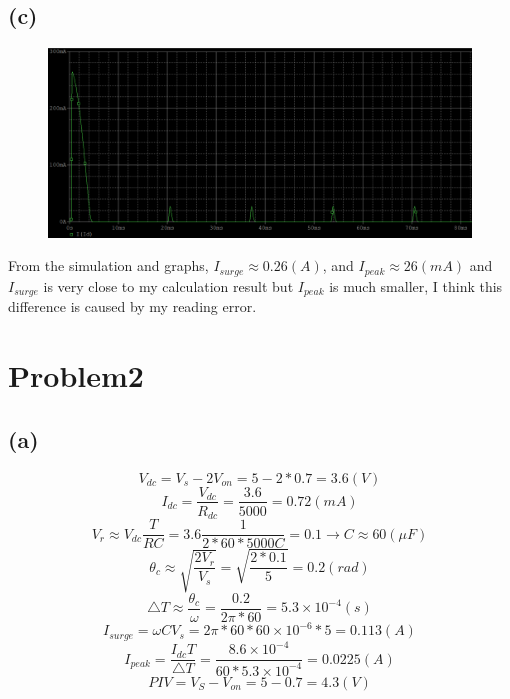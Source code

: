 \documentclass[12pt]{article}
\begin{document}
\subsection{(c)}
\begin{figure}[H]
\centering
\includegraphics[scale=0.3]{P2.png}
\end{figure}
\par From the simulation and graphs, $I_{surge}\approx 0.26(A)$, and $I_{peak} \approx 26(mA)$ and
$I_{surge}$ is very close to my calculation result but $I_{peak}$ is much smaller, I think this difference is caused by my reading error.

\section{Problem2}
\subsection{(a)}
$$V_{dc}=V_s-2V_{on}=5-2*0.7=3.6(V)$$
$$I_{dc}=\frac{V_{dc}}{R_{dc}}=\frac{3.6}{5000}=0.72(mA)$$
$$V_r\approx V_{dc}\frac{T}{RC}=3.6\frac{1}{2*60*5000C}=0.1\rightarrow C\approx60(\mu F)$$
$$\theta_c\approx \sqrt{\frac{2V_r}{V_s}}=\sqrt{\frac{2*0.1}{5}}=0.2(rad)$$
$$\triangle T\approx \frac{\theta_c}{\omega}=\frac{0.2}{2\pi *60}=5.3\times10^{-4}(s)$$
$$I_{surge}=\omega C V_s=2\pi *60*60\times10^{-6}*5=0.113(A)$$
$$I_{peak}=\frac{I_{dc}T}{\triangle T}=\frac{8.6\times10^{-4}}{60*5.3\times10^{-4}}=0.0225(A)$$
$$PIV=V_S-V_{on}=5-0.7=4.3(V)$$
\end{document}
